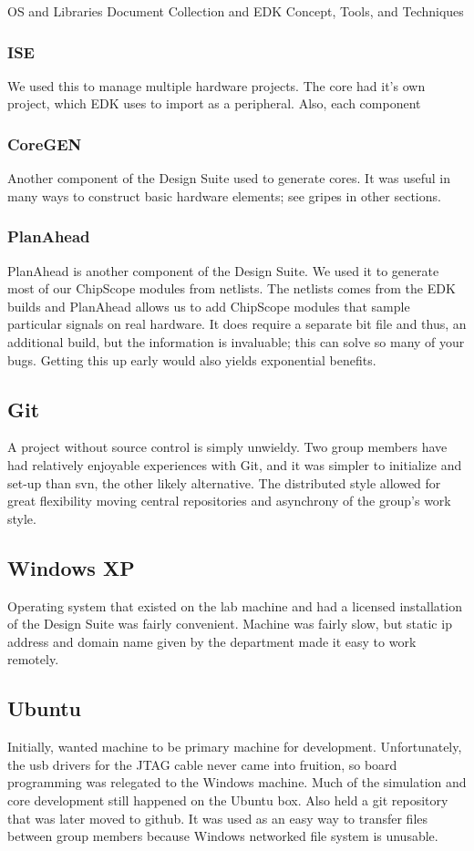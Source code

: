\documentclass[letterpaper,10pt]{article}
\begin{document}
OS and Libraries Document Collection and EDK Concept, Tools, and Techniques

\subsubsection{ISE}
We used this to manage multiple hardware projects.  The core had it's own project, which EDK uses to import as a peripheral.  Also, each component 

\subsubsection{CoreGEN}
Another component of the Design Suite used to generate cores.  It was useful in many ways to construct basic hardware elements; see gripes in other sections.

\subsubsection{PlanAhead}
PlanAhead is another component of the Design Suite.  We used it to generate most of our ChipScope modules from netlists.  The netlists comes from the EDK builds and PlanAhead allows us to add ChipScope modules that sample particular signals on real hardware.  It does require a separate bit file and thus, an additional build, but the information is invaluable; this can solve so many of your bugs.  Getting this up early would also yields exponential benefits.

\subsection{Git}
A project without source control is simply unwieldy.  Two group members have had relatively enjoyable experiences with Git, and it was simpler to initialize and set-up than svn, the other likely alternative.  The distributed style allowed for great flexibility moving central repositories and asynchrony of the group's work style.

\subsection{Windows XP}
Operating system that existed on the lab machine and had a licensed installation of the Design Suite was fairly convenient.  Machine was fairly slow, but static ip address and domain name given by the department made it easy to work remotely.

\subsection{Ubuntu}
Initially, wanted machine to be primary machine for development.  Unfortunately, the usb drivers for the JTAG cable never came into fruition, so board programming was relegated to the Windows machine.  Much of the simulation and core development still happened on the Ubuntu box.  Also held a git repository that was later moved to github.  It was used as an easy way to transfer files between group members because Windows networked file system is unusable.  
\end{document}
